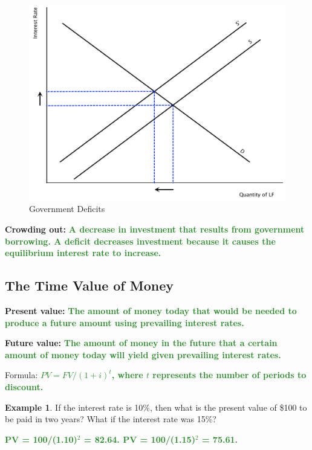 \documentclass[11pt]{article}\usepackage[]{graphicx}\usepackage[]{color}
\theoremstyle{definition}
\newtheorem{exmp}{Example}[section]
\newcommand{\blank}[1]{}
\newcommand{\ddp}[1]{{\textbf{\textcolor{ForestGreen}{#1}}}}
\newcommand{\defn}[1]{\textbf{#1}}
\begin{document}
			\begin{figure}[H]
				\centering
				\includegraphics[scale=.40]{plot92.pdf}
				\caption{Government Deficits}
			\end{figure}

	\defn{Crowding out:} \ddp{A decrease in investment that results from government borrowing. A deficit decreases investment because it causes the equilibrium interest rate to increase.}
	
\subsection{The Time Value of Money}

\defn{Present value:} \ddp{The amount of money today that would be needed to produce a future amount using prevailing interest rates.\\}

\defn{Future value:} \ddp{The amount of money in the future that a certain amount of money today will yield given prevailing interest rates.\\}

Formula: \ddp{$PV = FV/(1+i)^t$, where $t$ represents the number of periods to discount.}
\\

\begin{exmp} If the interest rate is 10\%, then what is the present value of \$100 to be paid in two years? What if the interest rate was 15\%?
\end{exmp}
\blank{}
\ddp{PV = 100/(1.10)$^2$ = 82.64. PV = 100/(1.15)$^2$ = 75.61.\\}
\end{document}
